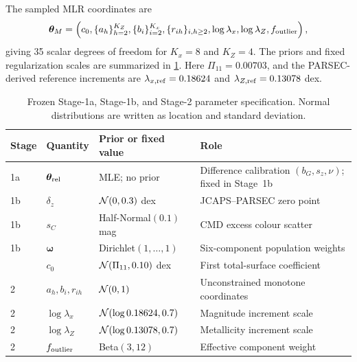 The sampled MLR coordinates are
\begin{equation}
 \bm\theta_M=\left(c_0,\{a_h\}_{h=2}^{K_Z},
 \{b_i\}_{i=2}^{K_x},\{r_{ih}\}_{i,h\ge2},
 \log\lambda_x,\log\lambda_Z,f_{\rm outlier}\right),
\end{equation}
giving 35 scalar degrees of freedom for $K_x=8$ and $K_Z=4$.  The priors and
fixed regularization scales are summarized in \cref{tab:priors}.  Here
$\Pi_{11}=0.00703$, and the PARSEC-derived reference increments are
$\lambda_{x,\rm ref}=0.18624$ and $\lambda_{Z,\rm ref}=0.13078$ dex.

\begin{table}[htbp]
\centering
\caption{Frozen Stage-1a, Stage-1b, and Stage-2 parameter specification.  Normal
distributions are written as location and standard deviation.}
\label{tab:priors}
\begin{tabularx}{\textwidth}{@{}lllX@{}}
\toprule
Stage & Quantity & Prior or fixed value & Role \\
\midrule
1a & $\bm\theta_{\rm rel}$ & MLE; no prior & Difference calibration $(b_G,s_z,\nu)$; fixed in Stage~1b \\
1b & $\delta_z$ & $\mathcal{N}(0,0.3)$ dex & JCAPS--PARSEC zero point \\
1b & $s_C$ & Half-Normal$(0.1)$ mag & CMD excess colour scatter \\
1b & $\bm\omega$ & Dirichlet$(1,\ldots,1)$ & Six-component population weights \\
\addlinespace
2 & $c_0$ & $\mathcal{N}(\Pi_{11},0.10)$ dex & First total-surface coefficient \\
2 & $a_h,b_i,r_{ih}$ & $\mathcal{N}(0,1)$ & Unconstrained monotone coordinates \\
2 & $\log\lambda_x$ & $\mathcal{N}(\log0.18624,0.7)$ & Magnitude increment scale \\
2 & $\log\lambda_Z$ & $\mathcal{N}(\log0.13078,0.7)$ & Metallicity increment scale \\
2 & $f_{\rm outlier}$ & Beta$(3,12)$ & Effective component weight \\
\bottomrule
\end{tabularx}
\end{table}
\FloatBarrier

